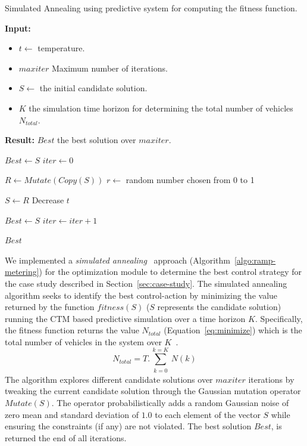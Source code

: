 \documentclass{wscpaperproc}
\theoremstyle{wsc}
\begin{document}
 \begin{algorithm}[!htbp]
 \caption{Simulated Annealing using predictive system for computing the fitness function.}
 \label{algo:ramp-metering}
 {\bf Input: }
 \begin{itemize}
 \item $t \leftarrow$ temperature.
 \item $maxiter$ Maximum number of iterations.
 \item $S \leftarrow$ the initial candidate solution.
 \item $K$ the simulation time horizon for determining the total number of vehicles $N_{total}$.
 \end{itemize}
 {\bf Result: }$Best$ the best solution over $maxiter$.
 \begin{algorithmic}[1]
 
 
 \State $Best\leftarrow S$
 \State $iter\leftarrow 0$

 \Repeat
 \State $R\leftarrow Mutate(Copy(S))$
 \State $r\leftarrow$ random number chosen from 0 to 1
 
  
 \State $S\leftarrow R$
 \EndIf
 \State Decrease $t$
 
 \State $Best\leftarrow S$
 \EndIf
 \State $iter\leftarrow iter+1$
 
 \State \Return $Best$
 \end{algorithmic}
 \end{algorithm}
 
We implemented a {\it simulated annealing}~\cite{weise2009global} approach (Algorithm~\ref{algo:ramp-metering}) for the optimization module to determine the best control strategy for the case study described in Section~\ref{sec:case-study}.
The simulated annealing algorithm seeks to identify the best control-action by minimizing the value returned by the function $fitness(S)$ ($S$ represents the candidate solution) running the CTM based predictive simulation over a time horizon $K$. Specifically, the fitness function returns the value $N_{total}$ (Equation~\ref{eq:minimize}) which is the total number of vehicles in the system over $K$~.
\begin{equation}
\label{eq:minimize}
N_{total}=T.\sum\limits_{\substack{k=0}}^{k=K}N(k)
\end{equation}
The algorithm explores different candidate solutions over $maxiter$ iterations by tweaking the current candidate solution through the Gaussian mutation operator $Mutate(S)$. The  operator probabilistically adds a random Gaussian noise of zero mean and standard deviation of $1.0$ to each element of the vector $S$ while ensuring the constraints (if any) are not violated. The best solution $Best$, is returned the end of all iterations. 
\end{document}
